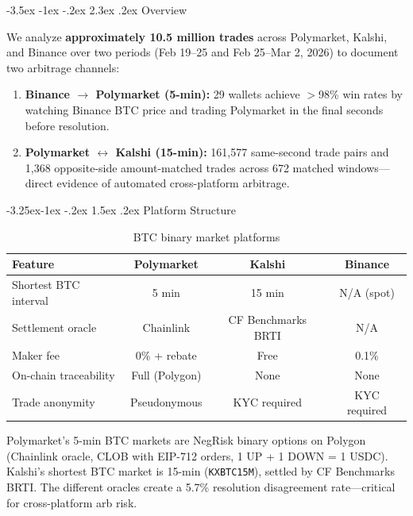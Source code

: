 \documentclass[11pt,a4paper]{article}
\makeatletter
\renewcommand\section{\@startsection{section}{1}{\z@}%
  {-3.5ex \@plus -1ex \@minus -.2ex}%
  {2.3ex \@plus .2ex}%
  {\normalfont\Large\bfseries}}
\renewcommand\subsection{\@startsection{subsection}{2}{\z@}%
  {-3.25ex\@plus -1ex \@minus -.2ex}%
  {1.5ex \@plus .2ex}%
  {\normalfont\large\bfseries}}
\makeatother
\begin{document}
\section{Overview}

We analyze \textbf{approximately 10.5 million trades} across Polymarket, Kalshi, and Binance over two periods (Feb 19--25 and Feb 25--Mar 2, 2026) to document two arbitrage channels:

\begin{enumerate}[nosep]
    \item \textbf{Binance $\to$ Polymarket (5-min):} 29 wallets achieve $>$98\% win rates by watching Binance BTC price and trading Polymarket in the final seconds before resolution.
    \item \textbf{Polymarket $\leftrightarrow$ Kalshi (15-min):} 161,577 same-second trade pairs and 1,368 opposite-side amount-matched trades across 672 matched windows---direct evidence of automated cross-platform arbitrage.
\end{enumerate}

\subsection{Platform Structure}

\begin{table}[H]
\centering
\caption{BTC binary market platforms}
\label{tab:platforms}
\small
\begin{tabular}{@{}lccc@{}}
\toprule
\textbf{Feature} & \textbf{Polymarket} & \textbf{Kalshi} & \textbf{Binance} \\
\midrule
Shortest BTC interval & 5 min & 15 min & N/A (spot) \\
Settlement oracle & Chainlink & CF Benchmarks BRTI & N/A \\
Maker fee & 0\% + rebate & Free & 0.1\% \\
On-chain traceability & Full (Polygon) & None & None \\
Trade anonymity & Pseudonymous & KYC required & KYC required \\
\bottomrule
\end{tabular}
\end{table}

Polymarket's 5-min BTC markets are NegRisk binary options on Polygon (Chainlink oracle, CLOB with EIP-712 orders, 1 UP + 1 DOWN = 1 USDC). Kalshi's shortest BTC market is 15-min (\texttt{KXBTC15M}), settled by CF Benchmarks BRTI. The different oracles create a 5.7\% resolution disagreement rate---critical for cross-platform arb risk.
\end{document}

